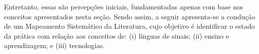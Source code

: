 Entretanto, essas são percepções iniciais, fundamentadas apenas com base nos conceitos apresentados nesta seção. Sendo assim, a seguir apresenta-se a condução de um Mapeamento Sistemático da Literatura, cujo objetivo é identificar o estado da prática com relação aos conceitos de: (i) línguas de sinais; (ii) ensino e aprendizagem; e (iii) tecnologias. %
